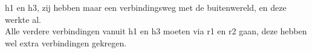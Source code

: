 h1 en h3, zij hebben maar een verbindingsweg met de buitenwereld, en deze werkte al.\\ Alle verdere verbindingen vanuit h1 en h3 moeten via r1 en r2 gaan, deze hebben wel extra verbindingen gekregen.
